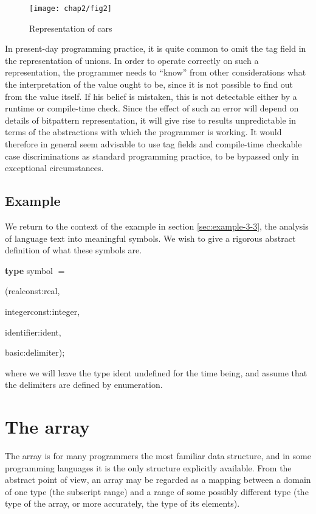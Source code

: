 \begin{figure}[ht!]
	\centering
	\texttt{[image: chap2/fig2]}
	\caption{Representation of cars}
\end{figure}

In present-day programming practice, it is quite common to omit the tag field in the representation of unions. In order to operate correctly on such a representation, the programmer needs to ``know'' from other considerations what the interpretation of the value ought to be, since it is not possible to find out from the value itself. If his belief is mistaken, this is not detectable either by a runtime or compile-time check. Since the effect of such an error will depend on details of bitpattern representation, it will give rise to results unpredictable in terms of the abstractions with which the programmer is working. It would therefore in general seem advisable to use tag fields and compile-time checkable case discriminations as standard programming practice, to be bypassed only in exceptional circumstances.

\subsection{Example}

We return to the context of the example in section \ref{sec:example-3-3}, the analysis of language text into meaningful symbols. We wish to give a rigorous abstract definition of what these symbols are.

\quad \textbf{type} symbol $=$

\tabto*{5.7em}(realconst:real,

\tabto*{6em}integerconst:integer,

\tabto*{6em}identifier:ident,

\tabto*{6em}basic:delimiter);

\noindent
where we will leave the type ident undefined for the time being, and assume that the delimiters are defined by enumeration.

\section{The array}
\label{sec:array}

The array is for many programmers the most familiar data structure, and in some programming languages it is the only structure explicitly available. From the abstract point of view, an array may be regarded as a mapping between a domain of one type (the subscript range) and a range of some possibly different type (the type of the array, or more accurately, the type of its elements).

